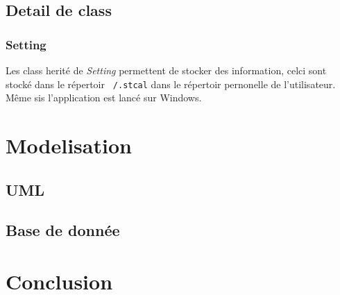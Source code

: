 \documentclass[a4paper,10pt]{report}
\begin{document}
	\section{Detail de class}

		\subsection{Setting}

			Les class herité de \textit{Setting} permettent de stocker des information, celci sont stocké dans le répertoir \texttt{~/.stcal} dans le répertoir pernonelle de l'utilisateur. Même sis l'application est lancé sur Windows.

\chapter{Modelisation}

	\section{UML}

	\section{Base de donnée}

\chapter*{Conclusion}
\end{document}
